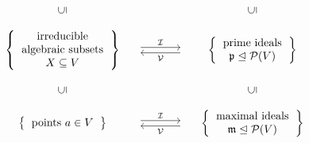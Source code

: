 \begin{theorem}
\begin{enumerate}
\[\begin{matrix}
            {}
          & {}
          & {}
          \\
            \rotatebox[origin=c]{90}{$\subseteq$}
          & {}
          & \rotatebox[origin=c]{90}{$\subseteq$}
          \\
            {}
          & {}
          & {}
          \\
            \left\{
              \begin{tabular}{c}
                  irreducible \\
                  algebraic subsets \\
                  $X \subseteq V$
              \end{tabular}
            \right\}
          & \begin{tikzcd}[column sep = large]
                {}
                \arrow[shift left]{r}{\mc{I}}
              & {}
                \arrow[shift left]{l}{\mc{V}}
            \end{tikzcd}
          & \left\{
              \begin{tabular}{c}
                prime ideals \\
                $\mf{p} \idealleq \mc{P}(V)$
              \end{tabular}
            \right\}
          \\
            {}
          & {}
          & {}
          \\
            \rotatebox[origin=c]{90}{$\subseteq$}
          & {}
          & \rotatebox[origin=c]{90}{$\subseteq$}
          \\
            {}
          & {}
          & {}
          \\
            \left\{
              \begin{tabular}{c}
                points $a \in V$
              \end{tabular}
            \right\}
          & \begin{tikzcd}[column sep = large]
                {}
                \arrow[shift left]{r}{\mc{I}}
              & {}
                \arrow[shift left]{l}{\mc{V}}
            \end{tikzcd}
          & \left\{
              \begin{tabular}{c}
                maximal ideals \\
                $\mf{m} \idealleq \mc{P}(V)$
              \end{tabular}
            \right\}
        \end{matrix}
      \]
  \end{enumerate}
\end{theorem}


